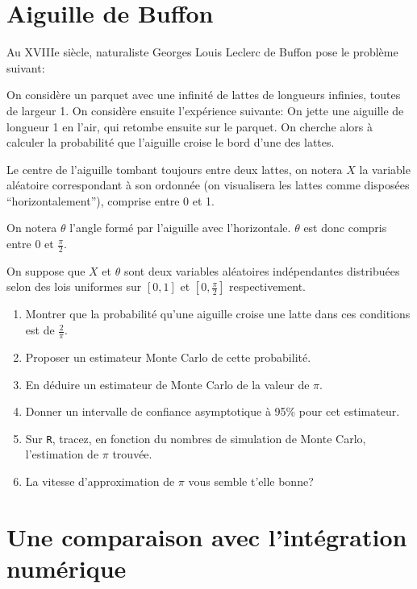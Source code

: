 \documentclass[]{article}
\providecommand{\tightlist}{%
  \setlength{\itemsep}{0pt}\setlength{\parskip}{0pt}}
\begin{document}
\hypertarget{aiguille-de-buffon}{%
\section{Aiguille de Buffon}\label{aiguille-de-buffon}}

Au XVIIIe siècle, naturaliste Georges Louis Leclerc de Buffon pose le
problème suivant:

On considère un parquet avec une infinité de lattes de longueurs
infinies, toutes de largeur 1. On considère ensuite l'expérience
suivante: On jette une aiguille de longueur 1 en l'air, qui retombe
ensuite sur le parquet. On cherche alors à calculer la probabilité que
l'aiguille croise le bord d'une des lattes.

Le centre de l'aiguille tombant toujours entre deux lattes, on notera
\(X\) la variable aléatoire correspondant à son ordonnée (on visualisera
les lattes comme disposées ``horizontalement''), comprise entre 0 et 1.

On notera \(\theta\) l'angle formé par l'aiguille avec l'horizontale.
\(\theta\) est donc compris entre 0 et \(\frac{\pi}{2}\).

On suppose que \(X\) et \(\theta\) sont deux variables aléatoires
indépendantes distribuées selon des lois uniformes sur \([0, 1]\) et
\([0 ,\frac{\pi}{2}]\) respectivement.

\begin{enumerate}
\def\labelenumi{\arabic{enumi}.}
\tightlist
\item
  Montrer que la probabilité qu'une aiguille croise une latte dans ces
  conditions est de \(\frac{2}{\pi}\).
\item
  Proposer un estimateur Monte Carlo de cette probabilité.
\item
  En déduire un estimateur de Monte Carlo de la valeur de \(\pi\).
\item
  Donner un intervalle de confiance asymptotique à 95\% pour cet
  estimateur.
\item
  Sur \texttt{R}, tracez, en fonction du nombres de simulation de Monte
  Carlo, l'estimation de \(\pi\) trouvée.
\item
  La vitesse d'approximation de \(\pi\) vous semble t'elle bonne?
\end{enumerate}

\hypertarget{une-comparaison-avec-lintuxe9gration-numuxe9rique}{%
\section{Une comparaison avec l'intégration
numérique}\label{une-comparaison-avec-lintuxe9gration-numuxe9rique}}
\end{document}
